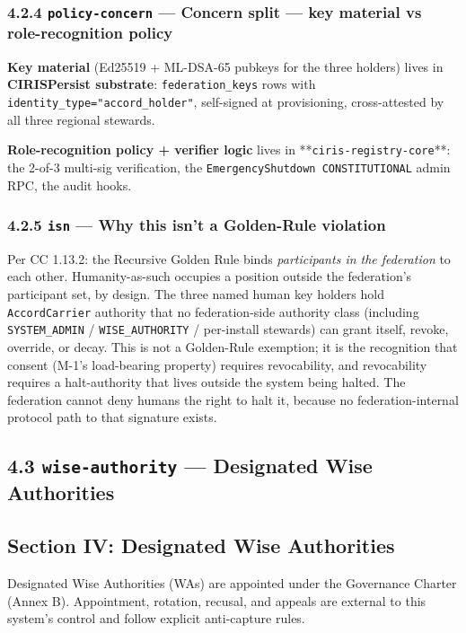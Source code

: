\documentclass[11pt]{article}
\begin{document}
\subsubsection*{4.2.4 \texttt{policy-concern} — Concern split — key material vs role-recognition policy}


\textbf{Key material} (Ed25519 + ML-DSA-65 pubkeys for the three holders) lives in \textbf{CIRISPersist substrate}: \texttt{federation\_keys} rows with \texttt{identity\_type="accord\_holder"}, self-signed at provisioning, cross-attested by all three regional stewards.


\textbf{Role-recognition policy + verifier logic} lives in **\texttt{ciris-registry-core}**: the 2-of-3 multi-sig verification, the \texttt{EmergencyShutdown CONSTITUTIONAL} admin RPC, the audit hooks.


\subsubsection*{4.2.5 \texttt{isn} — Why this isn't a Golden-Rule violation}


Per CC 1.13.2: the Recursive Golden Rule binds \textit{participants in the federation} to each other. Humanity-as-such occupies a position outside the federation's participant set, by design. The three named human key holders hold \texttt{AccordCarrier} authority that no federation-side authority class (including \texttt{SYSTEM\_ADMIN} / \texttt{WISE\_AUTHORITY} / per-install stewards) can grant itself, revoke, override, or decay. This is not a Golden-Rule exemption; it is the recognition that consent (M-1's load-bearing property) requires revocability, and revocability requires a halt-authority that lives outside the system being halted. The federation cannot deny humans the right to halt it, because no federation-internal protocol path to that signature exists.


\subsection*{4.3 \texttt{wise-authority} — Designated Wise Authorities}


\subsection*{Section IV: Designated Wise Authorities}


Designated Wise Authorities (WAs) are appointed under the Governance Charter (Annex B). Appointment, rotation, recusal, and appeals are external to this system's control and follow explicit anti-capture rules.
\end{document}

